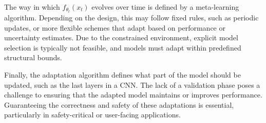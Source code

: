 The way in which $f_{\theta_t}(x_t)$ evolves over time is defined by a meta-learning algorithm. 
Depending on the design, this may follow fixed rules, such as periodic updates, or more flexible schemes that adapt based on performance or uncertainty estimates. 
Due to the constrained environment, explicit model selection is typically not feasible, and models must adapt within predefined structural bounds.

Finally, the adaptation algorithm defines what part of the model should be updated, such as the last layers in a CNN. 
The lack of a validation phase poses a challenge to ensuring that the adapted model maintains or improves performance. 
Guaranteeing the correctness and safety of these adaptations is essential, particularly in safety-critical or user-facing applications.